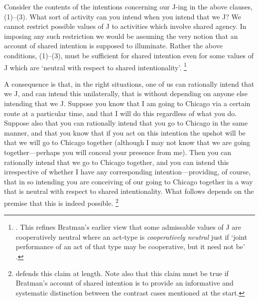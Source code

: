 \documentclass[12pt,\papersize]{extarticle}
\begin{document}
Consider the contents of the intentions concerning our J-ing in the above clauses, (1)--(3). 
What sort of activity can you intend when you intend that we J?
We cannot restrict possible values of J to activities which involve shared agency.
In imposing any such restriction we would be assuming the very notion that an account of shared intention is supposed to illuminate. 
%
Rather the above  conditions, (1)--(3), must be sufficient for shared intention even for some values of J which are `neutral with respect to shared intentionality'.%
\footnote{
 \citet[p.\ 147]{Bratman:1999fr}.
 This refines Bratman's earlier view that some admissable values of J are cooperatively neutral 
 	where an  act-type is \emph{cooperatively neutral} just if `joint performance of an act of that type may be cooperative, but it need not be' \citep[p.\ 330]{Bratman:1992mi}. 
}

A consequence is that, in the right situations, one of us can rationally intend that we J, and can intend this unilaterally, that is without depending on anyone else intending that we J. 
Suppose you know that I am going to Chicago via a certain route at a particular time, 
and that I will do this regardless of what you do.
Suppose also that you can rationally intend that you go to Chicago in the same manner,
and that you know that if you act on this intention the upshot will be that we will go to Chicago together (although I may not know that we are going together---perhaps you will conceal your presence from me).
Then you can rationally intend that we go to Chicago together, 
	and you can intend this irrespective of whether I have any corresponding intention---providing, of course, that in so intending you are conceiving of our going to Chicago together in a way that is neutral with respect to shared intentionality.
What follows depends on the premise that this is indeed possible.%
\footnote{ 
\citet{Bratman:1999fr}  defends this claim at length. 
Note also that this claim must be true if Bratman's account of shared intention is to provide an informative and systematic distinction between the contrast cases mentioned at the start.
}
\end{document}
